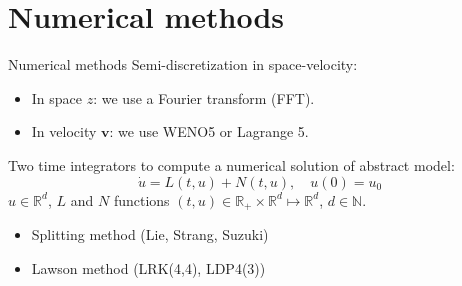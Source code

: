 \documentclass{beamer}
\newcommand{\Mvb}[1]{\boldsymbol{#1}}
\begin{document}
\section{Numerical methods}
\begin{frame}{Numerical methods}
  Semi-discretization in space-velocity:
  \begin{itemize}
    \item In space $z$: we use a Fourier transform (FFT).
    \item In velocity $\Mvb{v}$: we use WENO5 or Lagrange 5.
  \end{itemize}
  
  \vfill
  
  Two time integrators to compute a numerical solution of abstract model:
  $$
    \dot{u} = L(t,u) + N(t,u),\quad u(0) = u_0
  $$
  $u\in\mathbb{R}^d$, $L$ and $N$ functions $(t,u)\in\mathbb{R}_+\times\mathbb{R}^d\mapsto\mathbb{R}^d$, $d\in\mathbb{N}$.
  \vfill
  \begin{itemize}
    \item Splitting method (Lie, Strang, Suzuki)
    \item Lawson method (LRK(4,4), LDP4(3))
  \end{itemize}

\end{frame}
\end{document}
